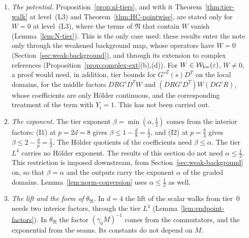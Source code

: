 \begin{remark}\label{rem:nl-scope}
\begin{enumerate}[label=(\alph*)]
\item \emph{The potential.} Proposition~\ref{prop:nl-tiers}, and with it Theorem~\ref{thm:tier-walk} at level~(L3) and Theorem~\ref{thm:HC-pointwise}, are stated only for $W=0$ at level~(L3), where the terms of $\mathfrak N$ that contain $W$ vanish (Lemma~\ref{lem:N-tier}). This is the only case used: these results enter the note only through the weakened background map, whose operators have $W=0$ (Section~\ref{sec:weak-background}), and through its extension to complex references (Proposition~\ref{prop:complex-ext}(b),(d)). For $W\in\mathcal W_{\rm loc}(\varepsilon)$, $W\ne0$, a proof would need, in addition, tier bounds for $G'^Z(s)D^T$ on the local domains, for the middle factors $DRG'D^TW$ and $(DRG'D^T)W(DG'R)$, whose coefficients are only H\"older continuous, and the corresponding treatment of the term with $Y_i=1$. This has not been carried out.
\item \emph{The exponent.} The tier exponent $\beta=\min(\alpha,\frac12)$ comes from the interior factors: (I1) at $p=2d=8$ gives $\beta\le1-\frac d8=\frac12$, and (I2) at $p=\frac83$ gives $\beta\le2-\frac dp=\frac12$. The H\"older quotients of the coefficients need $\beta\le\alpha$. The tier $L^4$ carries no H\"older exponent. The results of this section do not need $\alpha\le\frac12$. This restriction is imposed downstream, from Section~\ref{sec:weak-background} on, so that $\beta=\alpha$ and the outputs carry the exponent $\alpha$ of the graded domains. Lemma~\ref{lem:norm-conversion} uses $\alpha\le\frac12$ as well.
\item \emph{The lift and the form of $\theta_{\mathfrak N}$.} In $d=4$ the lift of the scalar walks from tier~$0$ needs two interior factors, through the tier $L^4$ (Lemma~\ref{lem:endpoint-factors}). In $\theta_{\mathfrak N}$ the factor $(\gamma_0M)^{-1}$ comes from the commutators, and the exponential from the seams. Its constants do not depend on $M$.
\end{enumerate}
\end{remark}


